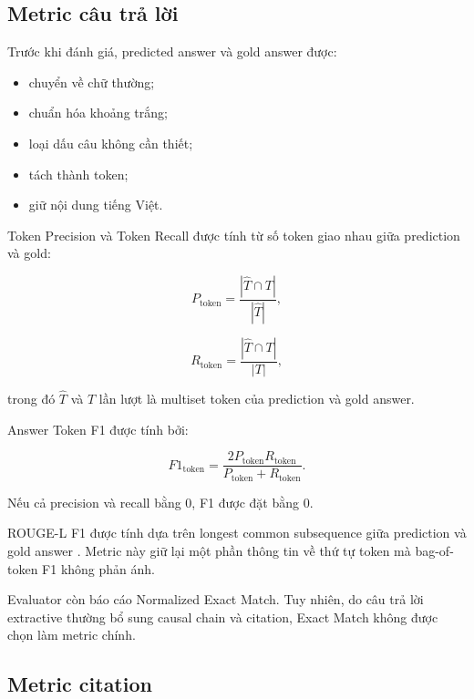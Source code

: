 \subsection{Metric câu trả lời}

Trước khi đánh giá, predicted answer và gold answer được:

\begin{itemize}
    \item chuyển về chữ thường;
    \item chuẩn hóa khoảng trắng;
    \item loại dấu câu không cần thiết;
    \item tách thành token;
    \item giữ nội dung tiếng Việt.
\end{itemize}

Token Precision và Token Recall được tính từ số token giao nhau giữa
prediction và gold:

\begin{equation}
P_{\mathrm{token}}
=
\frac{
    |\widehat{T} \cap T|
}{
    |\widehat{T}|
},
\end{equation}

\begin{equation}
R_{\mathrm{token}}
=
\frac{
    |\widehat{T} \cap T|
}{
    |T|
},
\end{equation}

trong đó \(\widehat{T}\) và \(T\) lần lượt là multiset token của prediction
và gold answer.

Answer Token F1 được tính bởi:

\begin{equation}
F1_{\mathrm{token}}
=
\frac{
    2P_{\mathrm{token}}R_{\mathrm{token}}
}{
    P_{\mathrm{token}}+R_{\mathrm{token}}
}.
\end{equation}

Nếu cả precision và recall bằng \(0\), F1 được đặt bằng \(0\).

ROUGE-L F1 được tính dựa trên longest common subsequence giữa prediction và
gold answer \cite{lin2004rouge}. Metric này giữ lại một phần thông tin về thứ
tự token mà bag-of-token F1 không phản ánh.

Evaluator còn báo cáo Normalized Exact Match. Tuy nhiên, do câu trả lời
extractive thường bổ sung causal chain và citation, Exact Match không được
chọn làm metric chính.

\subsection{Metric citation}

